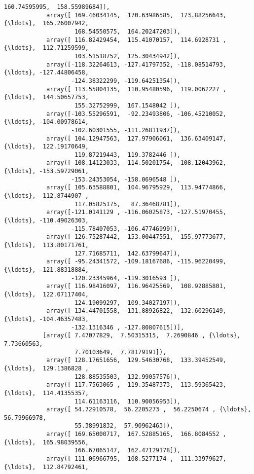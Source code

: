 \documentclass[11pt]{article}
\begin{document}
\begin{Verbatim}[commandchars=\\\{\}]
                    160.74595995,  158.55989684]),
            array([ 169.46034145,  170.63986585,  173.88256643, {\ldots},  165.26007942,
                    168.54550575,  164.20247203]),
            array([ 116.82429454,  115.41070157,  114.6928731 , {\ldots},  112.71259599,
                    103.51518752,  125.30434942]),
            array([-118.32264613, -127.41797352, -118.08514793, {\ldots}, -127.44806458,
                   -124.38322299, -119.64251354]),
            array([ 113.55804135,  110.95480596,  119.0062227 , {\ldots},  144.50657753,
                    155.32752999,  167.1548042 ]),
            array([-103.55296591,  -92.23493806, -106.45210052, {\ldots}, -104.00978614,
                   -102.60301555, -111.26811937]),
            array([ 104.12947563,  127.97906061,  136.63409147, {\ldots},  122.19170649,
                    119.87219443,  119.3782446 ]),
            array([-108.14123033, -114.50201754, -108.12043962, {\ldots}, -153.59729061,
                   -153.24353054, -158.0696548 ]),
            array([ 105.63588801,  104.96795929,  113.94774866, {\ldots},  112.8744907 ,
                    117.05825175,   87.36468781]),
            array([-121.0141129 , -116.06025873, -127.51970455, {\ldots}, -110.49026303,
                   -115.78407053, -106.47746999]),
            array([ 126.75287442,  153.00447551,  155.97773677, {\ldots},  113.80171761,
                    127.71685711,  142.63799647]),
            array([ -95.24341572, -109.18167686, -115.96220499, {\ldots}, -121.88318884,
                   -120.23345964, -119.3016593 ]),
            array([ 116.98416097,  116.96425569,  108.92885801, {\ldots},  122.07117404,
                    124.19099297,  109.34027197]),
            array([-134.44701558, -131.88926822, -132.60296149, {\ldots}, -104.46357483,
                   -132.1316346 , -127.80807615])],
           [array([ 7.47077829,  7.50315315,  7.2690846 , {\ldots},  7.73660563,
                    7.70103649,  7.78179191]),
            array([ 128.17651656,  129.54630768,  133.39452549, {\ldots},  129.1386828 ,
                    128.88535503,  132.99057576]),
            array([ 117.7563065 ,  119.35487373,  113.59365423, {\ldots},  114.41355357,
                    114.61163116,  110.90056953]),
            array([ 54.72910578,  56.2205273 ,  56.2250674 , {\ldots},  56.79966978,
                    55.38991832,  57.90962463]),
            array([ 169.65000717,  167.52885165,  166.8084552 , {\ldots},  165.98039556,
                    166.67065147,  162.47129178]),
            array([ 111.06966795,  108.5277174 ,  111.33979627, {\ldots},  112.84792461,

\end{Verbatim}
\end{document}
